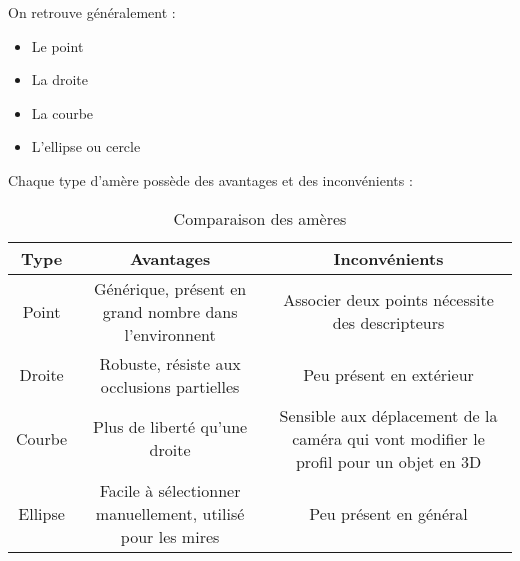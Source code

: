 On retrouve généralement :
\begin{itemize}
\item Le point
\item La droite
\item La courbe
\item L'ellipse ou cercle
\end{itemize}
Chaque type d'amère possède des avantages et des inconvénients :
\begin{table}[h]
  \begin{center}
    \begin{tabular}{|c|c|c|}
      \hline
      \bf Type & \bf Avantages & \bf Inconvénients \\
      \hline
      Point & \begin{minipage}{0.4\linewidth}Générique, présent en grand nombre dans l'environnent\end{minipage} & \begin{minipage}{0.4\linewidth}Associer deux points nécessite des descripteurs\end{minipage}\\
      \hline
      Droite & \begin{minipage}{0.4\linewidth}Robuste, résiste aux occlusions partielles\end{minipage} & \begin{minipage}{0.4\linewidth}Peu présent en extérieur\end{minipage}\\
      \hline
      Courbe & \begin{minipage}{0.4\linewidth}Plus de liberté qu'une droite\end{minipage} & \begin{minipage}{0.4\linewidth}Sensible aux déplacement de la caméra qui vont modifier le profil pour un objet en 3D\end{minipage}\\
      \hline
      Ellipse & \begin{minipage}{0.4\linewidth}Facile à sélectionner manuellement, utilisé pour les mires\end{minipage} & \begin{minipage}{0.4\linewidth}Peu présent en général\end{minipage}\\
      \hline
    \end{tabular}    		
  \end{center}
  \caption{Comparaison des amères}
\end{table}

